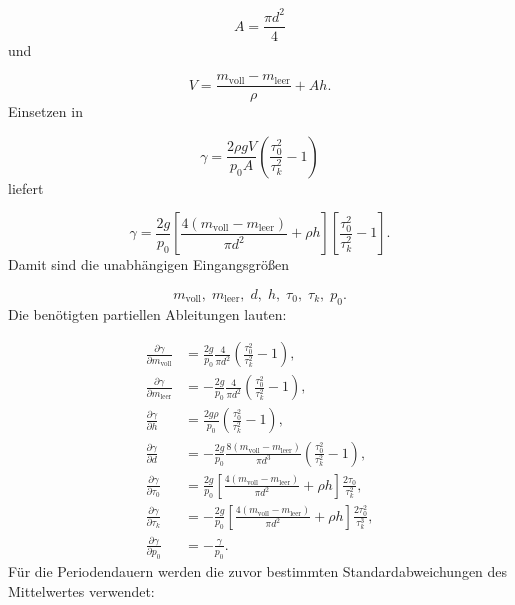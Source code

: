 \documentclass{report}
\begin{document}
\begin{equation}
A=\frac{\pi d^2}{4}
\end{equation}
\noindent
und

\begin{equation}
V=
\frac{m_\mathrm{voll}-m_\mathrm{leer}}{\rho}
+
Ah.
\end{equation}
\noindent
Einsetzen in

\begin{equation}
\gamma=
\frac{2\rho gV}{p_0A}
\left(
\frac{\tau_0^2}{\tau_k^2}-1
\right)
\end{equation}
\noindent
liefert

\begin{equation}
\gamma=
\frac{2g}{p_0}
\left[
\frac{4(m_\mathrm{voll}-m_\mathrm{leer})}{\pi d^2}
+\rho h
\right]
\left[
\frac{\tau_0^2}{\tau_k^2}-1
\right].
\label{eq:gamma_gauss}
\end{equation}
\noindent
Damit sind die unabhängigen Eingangsgrößen

\begin{equation}
m_\mathrm{voll},\;
m_\mathrm{leer},\;
d,\;
h,\;
\tau_0,\;
\tau_k,\;
p_0.
\end{equation}
\noindent
Die benötigten partiellen Ableitungen lauten:

\begin{align}
\frac{\partial\gamma}{\partial m_\mathrm{voll}}
&=
\frac{2g}{p_0}
\frac{4}{\pi d^2}
\left(
\frac{\tau_0^2}{\tau_k^2}-1
\right),
\\
\frac{\partial\gamma}{\partial m_\mathrm{leer}}
&=
-\frac{2g}{p_0}
\frac{4}{\pi d^2}
\left(
\frac{\tau_0^2}{\tau_k^2}-1
\right),
\\
\frac{\partial\gamma}{\partial h}
&=
\frac{2g\rho}{p_0}
\left(
\frac{\tau_0^2}{\tau_k^2}-1
\right),
\\
\frac{\partial\gamma}{\partial d}
&=
-\frac{2g}{p_0}
\frac{8(m_\mathrm{voll}-m_\mathrm{leer})}{\pi d^3}
\left(
\frac{\tau_0^2}{\tau_k^2}-1
\right),
\\
\frac{\partial\gamma}{\partial\tau_0}
&=
\frac{2g}{p_0}
\left[
\frac{4(m_\mathrm{voll}-m_\mathrm{leer})}{\pi d^2}
+\rho h
\right]
\frac{2\tau_0}{\tau_k^2},
\\
\frac{\partial\gamma}{\partial\tau_k}
&=
-\frac{2g}{p_0}
\left[
\frac{4(m_\mathrm{voll}-m_\mathrm{leer})}{\pi d^2}
+\rho h
\right]
\frac{2\tau_0^2}{\tau_k^3},
\\
\frac{\partial\gamma}{\partial p_0}
&=
-\frac{\gamma}{p_0}.
\end{align}
\noindent
Für die Periodendauern werden die zuvor bestimmten Standardabweichungen
des Mittelwertes verwendet:
\end{document}
